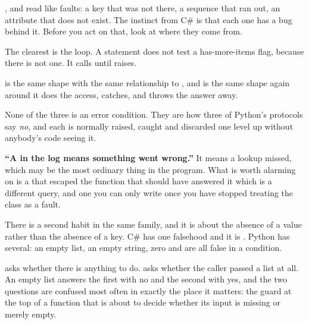 ,  and  read like
faults: a key that was not there, a sequence that ran out, an attribute that
does not exist. The instinct from C\# is that each one has a bug behind it.
Before you act on that, look at where they come from.

The clearest is the loop. A  statement does not test a
has-more-items flag, because there is not one. It calls  until
 raises.


\noindent
{} is the same shape with the same relationship to
, and  is the same shape again around
 \dash{} it does the access, catches, and throws the
answer away.


\noindent
None of the three is an error condition. They are how three of Python's
protocols say \emph{no}, and each is normally raised, caught and discarded
one level up without anybody's code seeing it.

\begin{trapbox}
\textbf{\enquote{A  in the log means something went wrong.}}
It means a lookup missed, which may be the most ordinary thing in the
program. What is worth alarming on is a  that escaped the
function that should have answered it \dash{} which is a different query,
and one you can only write once you have stopped treating the class as a
fault.
\end{trapbox}

\noindent
There is a second habit in the same family, and it is about the absence of a
value rather than the absence of a key. C\# has one falsehood and it is
. Python has several: an empty list, an empty string, zero and
 are all false in a condition.


\noindent
{} asks whether there is anything to do.  asks whether the caller passed a list at all. An empty list answers
the first with no and the second with yes, and the two questions are
confused most often in exactly the place it matters: the guard at the top of
a function that is about to decide whether its input is missing or merely
empty.

